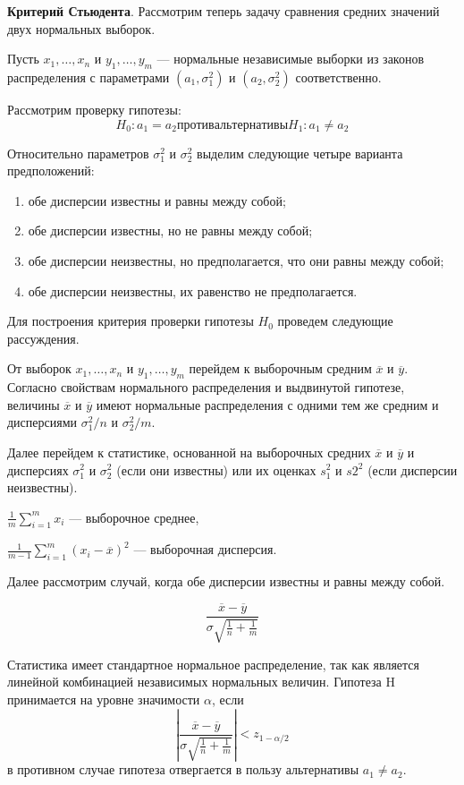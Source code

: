 \textbf{Критерий Стьюдента}. Рассмотрим теперь задачу сравнения средних
значений двух нормальных выборок.

Пусть $x_1,…,x_n$ и $y_1,…,y_m$ — нормальные независимые выборки из законов
распределения с параметрами $(a_1,\sigma_1^2 )$ и $(a_2,\sigma_2^2 )$ соответственно.

Рассмотрим проверку гипотезы:
\begin{equation}
	H_0: a_1 = a_2 против альтернативы H_1: a_1 \neq a_2
\end{equation}

Относительно параметров $\sigma_1^2$ и $\sigma_2^2$ выделим следующие четыре варианта
предположений:

\begin{enumerate}[label*=\arabic*)]
	\item обе дисперсии известны и равны между собой;
	\item обе дисперсии известны, но не равны между собой;
	\item обе дисперсии неизвестны, но предполагается, что они равны между собой;
	\item обе дисперсии неизвестны, их равенство не предполагается.
\end{enumerate}

Для построения критерия проверки гипотезы $H_0$ проведем
следующие рассуждения.

От выборок $x_1,…,x_n$ и $y_1,…,y_m$ перейдем к выборочным средним $\overline{x}$ и $\overline{y}$. Согласно свойствам нормального распределения и выдвинутой гипотезе, величины $\overline{x}$ и $\overline{y}$
имеют нормальные распределения с одними
тем же средним и дисперсиями $\sigma_1^2/n$ и $\sigma_2^2/m$.

Далее перейдем к статистике, основанной на выборочных средних $\overline{x}$ и $\overline{y}$ и дисперсиях $\sigma_1^2$ и $\sigma_2^2$ (если они известны) или их оценках $s_1^2$ и $s2^2$ (если дисперсии неизвестны).

	$\frac{1}{m}\sum\nolimits_{i=1}^m x_i$ — выборочное среднее,

	$\frac{1}{m-1}\sum\nolimits_{i=1}^m (x_i-\overline{x})^2$ — выборочная дисперсия.
	
Далее рассмотрим случай, когда обе дисперсии известны и равны между собой.

\begin{equation}
	\frac{\overline{x} - \overline{y}}{\sigma \sqrt{\frac{1}{n} + \frac{1}{m}}}
\end{equation}

Статистика имеет стандартное нормальное распределение, так как является
линейной комбинацией независимых нормальных величин. Гипотеза H
принимается на уровне значимости $\alpha$, если
\begin{equation}
	\left| \frac{\overline{x} - \overline{y}}{\sigma \sqrt{\frac{1}{n} + \frac{1}{m}}} \right| < z_{1-\alpha/2}
\end{equation}
в противном случае гипотеза отвергается в пользу альтернативы $a_1 \neq a_2$.



\clearpage
